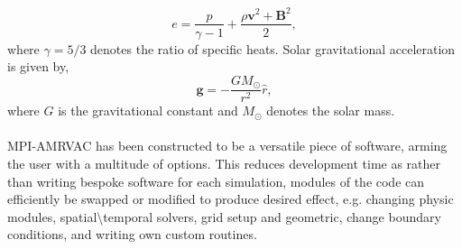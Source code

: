 \documentclass[12pt]{ociamthesis}
\newcommand{\bs}[1]{\boldsymbol{#1}}
\newcommand{\np}{\\ \\}
\begin{document}
\begin{equation}
e = \frac{p}{\gamma-1}+ \frac{\rho \bs{v}^2+\bs{B}^2}{2},
\end{equation}
where $\gamma=5/3$ denotes the ratio of specific heats. Solar gravitational acceleration is given by,
\begin{equation}
\bs{g}=-\frac{GM_{\odot}}{r^2}\hat{r},
\end{equation}
where $G$ is the gravitational constant and $M_{\odot}$ denotes the solar mass. \np
%
MPI-AMRVAC has been constructed to be a versatile piece of software, arming the user with a multitude of options. This reduces development time as rather than writing bespoke software for each simulation, modules of the code can efficiently be swapped or modified to produce desired effect, e.g. changing physic modules, spatial\textbackslash temporal solvers, grid setup and geometric, change boundary conditions, and writing own custom routines.
\end{document}
